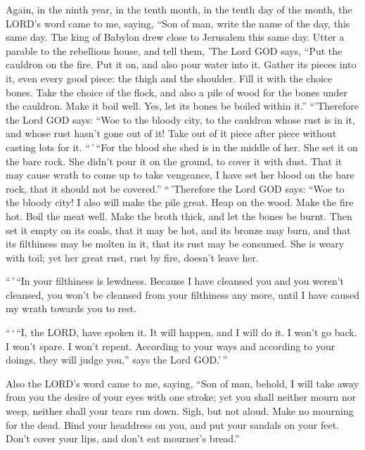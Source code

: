 Again, in the ninth year, in the tenth month, in the tenth
day of the month, the LORD's word came to me, saying,  ``Son
of man, write the name of the day, this same day. The king of Babylon
drew close to Jerusalem this same day.  Utter a parable to
the rebellious house, and tell them, 'The Lord GOD says, ``Put the
cauldron on the fire. Put it on, and also pour water into it.
 Gather its pieces into it, even every good piece: the thigh
and the shoulder. Fill it with the choice bones.  Take the
choice of the flock, and also a pile of wood for the bones under the
cauldron. Make it boil well. Yes, let its bones be boiled within it.''
 ``'Therefore the Lord GOD says: ``Woe to the bloody city,
to the cauldron whose rust is in it, and whose rust hasn't gone out of
it! Take out of it piece after piece without casting lots for it.
 ``\,'\,``For the blood she shed is in the middle of her.
She set it on the bare rock. She didn't pour it on the ground, to cover
it with dust.  That it may cause wrath to come up to take
vengeance, I have set her blood on the bare rock, that it should not be
covered.''  ``\,'Therefore the Lord GOD says: ``Woe to the
bloody city! I also will make the pile great.  Heap on the
wood. Make the fire hot. Boil the meat well. Make the broth thick, and
let the bones be burnt.  Then set it empty on its coals,
that it may be hot, and its bronze may burn, and that its filthiness may
be molten in it, that its rust may be consumed.  She is
weary with toil; yet her great rust, rust by fire, doesn't leave her.

 ``\,'\,``In your filthiness is lewdness. Because I have
cleansed you and you weren't cleansed, you won't be cleansed from your
filthiness any more, until I have caused my wrath towards you to rest.

 ``\,`\,``I, the LORD, have spoken it. It will happen, and
I will do it. I won't go back. I won't spare. I won't repent. According
to your ways and according to your doings, they will judge you,'' says
the Lord GOD.'\,''

 Also the LORD's word came to me, saying, 
``Son of man, behold, I will take away from you the desire of your eyes
with one stroke; yet you shall neither mourn nor weep, neither shall
your tears run down.  Sigh, but not aloud. Make no mourning
for the dead. Bind your headdress on you, and put your sandals on your
feet. Don't cover your lips, and don't eat mourner's bread.''

